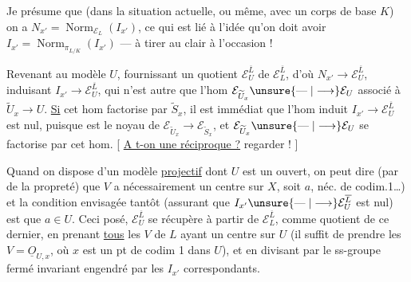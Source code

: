 Je présume que (dans la situation actuelle, ou même, avec un corps de base $K$) on a $N_{x'}=\operatorname{Norm}_{\mathcal E_L}(I_{x'})$,  ce qui est lié à l'idée qu'on doit avoir $I_{x'}=\operatorname{Norm}_{\pi_{L/K}}(I_{x'})$
--- à tirer au clair à l'occasion !

Revenant au modèle $U$, fournissant un quotient $\mathcal E_U^{\overline L}$ de $\mathcal E_L^{\overline L}$, d'où $N_{x'}\longrightarrow\mathcal E_U^{\overline L}$, induisant $I_{x'}\longrightarrow\mathcal E_U^{\overline L}$,
qui n'est autre que l'hom  $\mathcal E_{\widetilde U_x}\unsure{\mathrel{\text{---}}|\longrightarrow}\mathcal E_U$ associé à $\widetilde U_x\longrightarrow U$. \uline{Si} cet hom factorise par $\widetilde S_x$, il est immédiat que l'hom induit $I_{x'}\longrightarrow\mathcal E_U^{\overline L}$ est nul, puisque  est le noyau de $\mathcal E_{\widetilde U_x}\longrightarrow\mathcal E_{\widetilde S_x}$, et $\mathcal E_{\widetilde U_x}\unsure{\mathrel{\text{---}}|\longrightarrow}\mathcal E_U$ se factorise par cet hom.
[ \uline{A t-on une réciproque ?} regarder ! ]

Quand on dispose d'un modèle \uline{projectif} dont $U$ est un ouvert, on peut dire (par  de la propreté) que $V$ a nécessairement un centre sur $X$, soit $a$,   néc. de codim.1\ldots) et la condition envisagée tantôt (assurant que $I_{x'}\unsure{\mathrel{\text{---}}|\longrightarrow}\mathcal E_U^{\overline L}$ est nul) est que $a\in U$.
Ceci posé, $\mathcal E_U^{\overline L}$ se récupère à partir de $\mathcal E_L^{\overline L}$, comme quotient de ce dernier, en prenant \uline{tous} les $V$ de $L$ ayant un centre sur $U$ (il suffit  de prendre les $V=\underline{O}_{U,x}$, où $x$ est un pt de codim 1 dans $U$), et en divisant par le ss-groupe fermé invariant engendré par les $I_{x'}$ correspondants.

